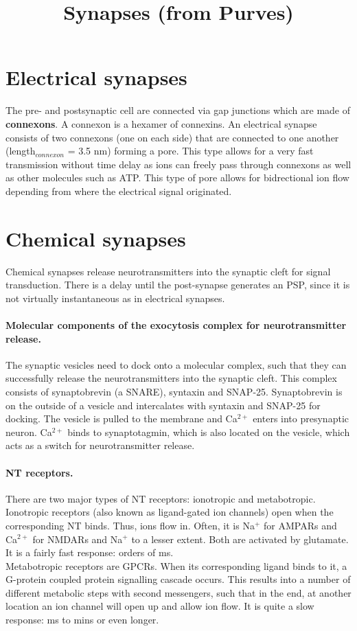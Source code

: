 \documentclass[pt11, a4wide, twosided]{article}
\begin{document}
	\title{Synapses (from Purves)}
	
	\maketitle
	
	\section{Electrical synapses}
	The pre- and postsynaptic cell are connected via gap junctions which are made of \textbf{connexons}. A connexon is a hexamer of connexins. An electrical synapse consists of two connexons (one on each side) that are connected to one another (length$_{connexon}$ = 3.5 nm) forming a pore. This type allows for a very fast transmission without time delay as ions can freely pass through connexons as well as other molecules such as ATP. This type of pore allows for bidrectional ion flow depending from where the electrical signal originated.
	
	\section{Chemical synapses}
	Chemical synapses release neurotransmitters into the synaptic cleft for signal transduction. There is a delay until the post-synapse generates an PSP, since it is not virtually instantaneous as in electrical synapses.
	
	\paragraph{Molecular components of the exocytosis complex for neurotransmitter release.}The synaptic vesicles need to dock onto a molecular complex, such that they can successfully release the neurotransmitters into the synaptic cleft. This complex consists of synaptobrevin (a SNARE), syntaxin and SNAP-25. Synaptobrevin is on the outside of a vesicle and intercalates with syntaxin and SNAP-25 for docking. The vesicle is pulled to the membrane and Ca$^{2+}$ enters into presynaptic neuron. Ca$^{2+}$ binds to synaptotagmin, which is also located on the vesicle, which acts as a switch for neurotransmitter release.
	
	\paragraph{NT receptors.} There are two major types of NT receptors: ionotropic and metabotropic.\\
	Ionotropic receptors (also known as ligand-gated ion channels) open when the corresponding NT binds. Thus, ions flow in. Often, it is Na$^{+}$ for AMPARs and Ca$^{2+}$ for NMDARs and Na$^{+}$ to a lesser extent. Both are activated by glutamate. It is a fairly fast response: orders of ms.\\
	Metabotropic receptors are GPCRs. When its corresponding ligand binds to it, a G-protein coupled protein signalling cascade occurs. This results into a number of different metabolic steps with second messengers, such that in the end, at another location an ion channel will open up and allow ion flow. It is quite a slow response: ms to mins or even longer.
	
	
\end{document}
